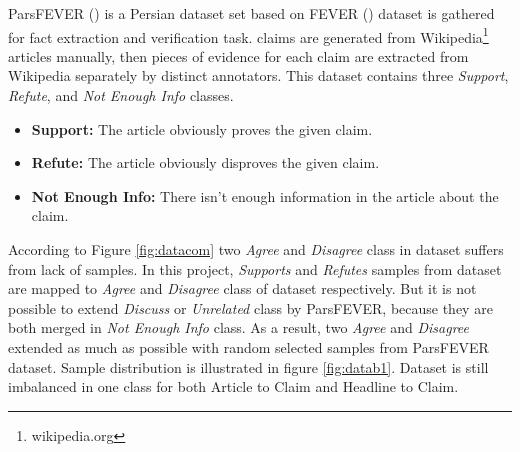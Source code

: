 ParsFEVER (\cite{parsfever}) is a Persian dataset set based on FEVER (\cite{fever}) dataset is gathered for fact extraction and verification task. \cite{parsfever} claims are generated from Wikipedia\footnote{wikipedia.org} articles manually, then pieces of evidence for each claim are extracted from Wikipedia separately by distinct annotators. This dataset contains three \textit{Support}, \textit{Refute}, and \textit{Not Enough Info} classes. 
\begin{itemize}
	\item {\color{green!70!black}\textbf{Support:}} The article obviously proves the given claim. 
	\item {\color{red!60!black}\textbf{Refute:}} The article obviously disproves the given claim.
	\item {\color{gray}\textbf{Not Enough Info:}} There isn't enough information in the article about the claim. 
\end{itemize}                

According to Figure \ref{fig:datacom} two \textit{Agree} and \textit{Disagree} class in \cite{stance_persian} dataset suffers from lack of samples. In this project, \textit{Supports} and \textit{Refutes} samples from \cite{parsfever} dataset are mapped to \textit{Agree} and \textit{Disagree} class of \cite{stance_persian} dataset respectively. 
But it is not possible to extend \textit{Discuss} or \textit{Unrelated} class by ParsFEVER, because they are both merged in \textit{Not Enough Info} class. As a result, two \textit{Agree} and \textit{Disagree} extended as much as possible with random selected samples from ParsFEVER dataset. Sample distribution is illustrated in figure \ref{fig:datab1}. Dataset is still imbalanced in one class for both Article to Claim and Headline to Claim.

